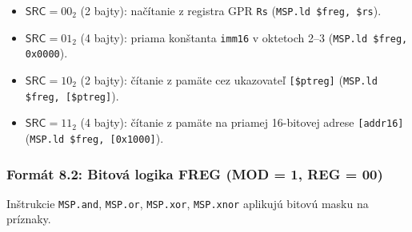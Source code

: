 \documentclass[11pt,a4paper]{article}
\newcommand{\reg}[1]{\texttt{#1}}
\newcommand{\field}[1]{\textsf{#1}}
\begin{document}
\begin{itemize}
  \item $\field{SRC} = 00_2$ (2 bajty): načítanie z registra GPR \reg{Rs} (\texttt{MSP.ld \$freg, \$rs}).
  \item $\field{SRC} = 01_2$ (4 bajty): priama konštanta \texttt{imm16} v oktetoch 2--3 (\texttt{MSP.ld \$freg, 0x0000}).
  \item $\field{SRC} = 10_2$ (2 bajty): čítanie z pamäte cez ukazovateľ \texttt{[\$ptreg]} (\texttt{MSP.ld \$freg, [\$ptreg]}).
  \item $\field{SRC} = 11_2$ (4 bajty): čítanie z pamäte na priamej 16-bitovej adrese \texttt{[addr16]} (\texttt{MSP.ld \$freg, [0x1000]}).
\end{itemize}

\subsubsection{Formát 8.2: Bitová logika FREG (MOD = 1, REG = 00)}
Inštrukcie \texttt{MSP.and}, \texttt{MSP.or}, \texttt{MSP.xor}, \texttt{MSP.xnor} aplikujú bitovú masku na príznaky.
\end{document}
